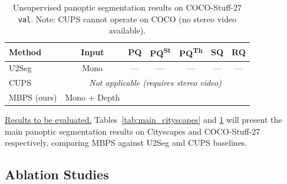\documentclass{article}
\begin{document}
\begin{table}[t]
\centering
\caption{Unsupervised panoptic segmentation results on COCO-Stuff-27 \texttt{val}. Note: CUPS cannot operate on COCO (no stereo video available).}
\label{tab:main_coco}
\begin{tabular}{lcccccc}
\toprule
\textbf{Method} & \textbf{Input} & \textbf{PQ} & \textbf{PQ\textsuperscript{St}} & \textbf{PQ\textsuperscript{Th}} & \textbf{SQ} & \textbf{RQ} \\
\midrule
U2Seg~\cite{niu2024u2seg} & Mono & --- & --- & --- & --- & --- \\
CUPS~\cite{hahn2025cups} & \multicolumn{6}{c}{\emph{Not applicable (requires stereo video)}} \\
\midrule
MBPS (ours) & Mono + Depth & \underline{\hspace{2em}} & \underline{\hspace{2em}} & \underline{\hspace{2em}} & \underline{\hspace{2em}} & \underline{\hspace{2em}} \\
\bottomrule
\end{tabular}
\end{table}

\underline{Results to be evaluated.} Tables~\ref{tab:main_cityscapes} and \ref{tab:main_coco} will present the main panoptic segmentation results on Cityscapes and COCO-Stuff-27 respectively, comparing MBPS against U2Seg and CUPS baselines.


\subsection{Ablation Studies}
\end{document}
